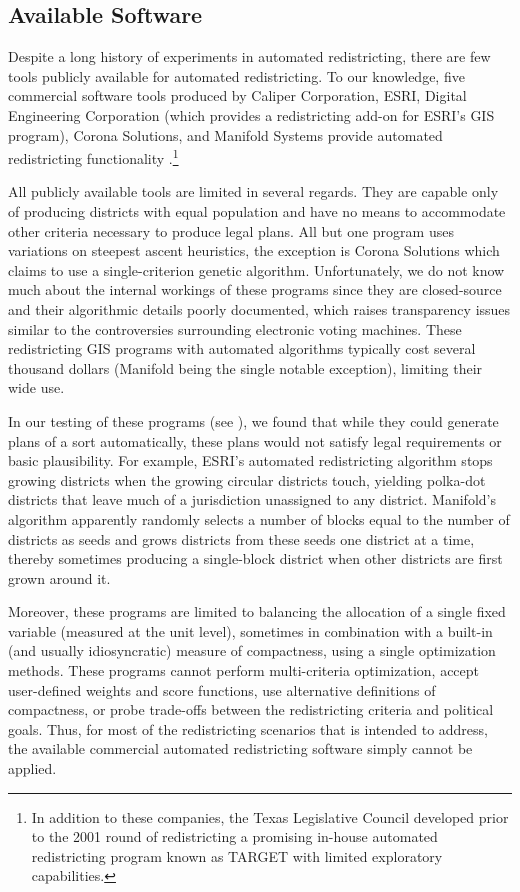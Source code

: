 \documentclass[article]{JSSstyle/jss}
\begin{document}
\subsection{Available Software}

Despite a long history of experiments in automated redistricting, 
there are few tools publicly available for automated redistricting. 
To our knowledge, five commercial software tools produced by Caliper 
Corporation, ESRI, Digital Engineering Corporation (which provides 
a redistricting add-on for ESRI's GIS program), Corona Solutions, 
and Manifold Systems provide automated redistricting functionality 
\citep[][]{AltMacMcD05}.\footnote{In addition to these companies, 
the Texas Legislative Council developed prior to the 2001 round of redistricting a promising in-house 
automated redistricting program known as TARGET with limited exploratory
capabilities.}   

All publicly available tools are limited in several regards.  
They are capable only of producing districts with equal 
population and have no means to accommodate other criteria necessary 
to produce legal plans. All but one program uses variations on 
steepest ascent heuristics, the exception is Corona Solutions which 
claims to use a single-criterion genetic algorithm.  Unfortunately, 
we do not know much about the internal workings of these programs since they are 
closed-source and their algorithmic details poorly documented, which raises transparency issues similar to the controversies surrounding 
electronic voting machines.  These redistricting GIS programs with automated algorithms typically 
cost several thousand dollars (Manifold being the single notable exception), limiting their wide use.  

In our testing of these programs (see \citet{AltMacMcD05}), we found that while they could generate plans of a sort automatically, these plans would not satisfy legal requirements or basic plausibility. 
For example, ESRI's automated redistricting algorithm stops growing districts when the growing circular districts touch, yielding polka-dot districts that leave much of a jurisdiction unassigned to any district. Manifold's algorithm apparently randomly selects a number of blocks equal to the number of districts as seeds and grows districts from these seeds one district at a time, thereby sometimes producing a single-block district when other districts are first grown around it. 

Moreover, these programs are limited to balancing the allocation of a single fixed variable (measured at the unit level), sometimes in combination with a built-in (and usually idiosyncratic) measure of compactness, using a single optimization methods. These programs cannot perform multi-criteria optimization, accept user-defined weights and score functions, use alternative definitions of compactness, or probe trade-offs between the redistricting criteria and political goals. Thus, for most of the redistricting scenarios that  is intended to address, the available commercial automated redistricting software simply cannot be applied.
\end{document}
